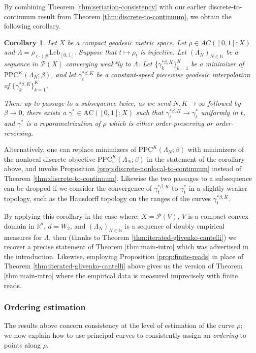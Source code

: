 \documentclass[aos, preprint]{imsart}
\theoremstyle{plain}
\newtheorem{cor}[theorem]{Corollary}
\theoremstyle{remark}
\begin{document}
{By combining Theorem \ref{thm:seriation-consistency} with our earlier discrete-to-continuum result from Theorem \ref{thm:discrete-to-continuum}, we obtain the following corollary.

\begin{cor}
Let $X$ be a compact geodesic metric
space. Let $\rho\in AC([0,1];X)$ and $\Lambda=\rho_{(\cdot)\#}\mathrm{Leb}_{[0,1]}$.
Suppose that $t\mapsto\rho_{t}$ is injective. Let $(\Lambda_N)_{N\in\mathbb{N}}$ be a sequence in $\mathcal{P}(X)$ converging weak*ly to $\Lambda$. Let $\{\gamma_{k}^{*\beta,K}\}_{k=1}^{K}$ be a
minimizer of $\text{PPC}^{K}(\Lambda_{N};\beta)$, and let $\gamma^{*\beta,K}_t$ be a
constant-speed piecewise geodesic interpolation of
$\{\gamma_{k}^{*\beta,K}\}_{k=1}^{K}$.

Then: up to passage to a subsequence twice,
as we send $N,K\rightarrow\infty$ followed by $\beta\rightarrow 0$, there exists a $\gamma^{*}\in \textrm{AC}([0,1];X)$ such that
$\gamma_{t}^{*\beta,K}\rightarrow\gamma_{t}^{*}$ uniformly in
$t$, and $\gamma^*$ is a reparametrization of $\rho$ which is either order-preserving or order-reversing.
\end{cor}

Alternatively, one can replace minimizers of $\mathrm{PPC}^K(\Lambda_N;\beta)$ with minimizers of the nonlocal discrete objective $\mathrm{PPC}^K_w(\Lambda_N;\beta)$ in the statement of the corollary above, and invoke Proposition \ref{prop:discrete-nonlocal-to-continuum} instead of Theorem \ref{thm:discrete-to-continuum}. Likewise the two passages to a subsequence can be dropped if we consider the convergence of $\gamma_{t}^{*\beta,K}$ to $\gamma^*_t$ in a slightly weaker topology, such as the Hausdorff topology on the ranges of the curves $\gamma_{t}^{*\beta,K}$.

By applying this corollary in the case where: $X=\mathcal{P}(V)$, $V$ is a compact convex domain in $\mathbb{R}^d$, $d=W_2$, and $(\Lambda_N)_{N\in\mathbb{N}}$ is a sequence of doubly empirical measures for $\Lambda$, then (thanks to Theorem \ref{thm:iterated-glivenko-cantelli}) we recover a precise statement of Theorem \ref{thm:main-intro} which was advertised in the introduction. Likewise, employing Proposition \ref{prop:finite-reads} in place of Theorem \ref{thm:iterated-glivenko-cantelli} above gives us the version of Theorem \ref{thm:main-intro} where the empirical data is measured imprecisely with finite reads.


\subsubsection*{Ordering estimation}
The results above concern consistency at the level of estimation of the curve $\rho$; we now explain how to use principal curves to consistently assign an \emph{ordering} to points along $\rho$.

}
\end{document}
